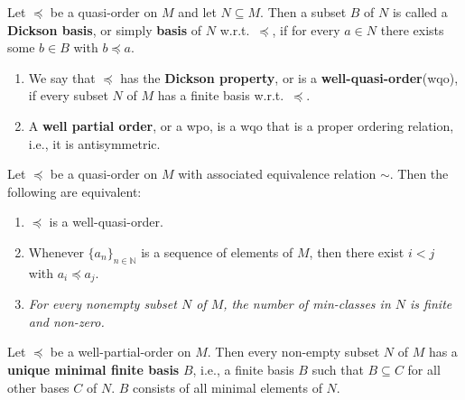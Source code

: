 \begin{definition}\label{def:wqo}
    \leanok %
    Let $\preceq$ be a quasi-order on $M$ and let $N \subseteq M$. 
    Then a subset $B$ of $N$ is called a \textbf{Dickson basis}, or simply \textbf{basis} of $N$ w.r.t.\ $\preceq$, if for every $a \in N$ there exists some $b \in B$ with $b \preceq a$.
    \begin{enumerate}
        \item We say that $\preceq$ has the \textbf{Dickson property}, or is a \textbf{well-quasi-order}(wqo), if every subset $N$ of $M$ has a finite basis w.r.t.\ $\preceq$.
        \item A \textbf{well partial order}, or a wpo, is a wqo that is a proper ordering relation, i.e., it is antisymmetric.
    \end{enumerate}
\end{definition}
    
\begin{proposition}\label{prop:wqoEquivalent} %
    Let $\preceq$ be a quasi-order on $M$ with associated equivalence relation $\sim$. 
    Then the following are equivalent:
    \begin{enumerate}
        \item $\preceq$ is a well-quasi-order.
        \item Whenever $\{a_n\}_{n \in \mathbb{N}}$ is a sequence of elements of $M$, then there exist $i < j$ with $a_i \preceq a_j$.
        \item \textit{For every nonempty subset $N$ of $M$, the number of min-classes in $N$ is finite and non-zero.}
    \end{enumerate}
\end{proposition}
    
\begin{corollary}\label{cor:MinimalFiniteBasis} %
    Let $\preceq$ be a well-partial-order on $M$.
    Then every non-empty subset $N$ of $M$ has a \textup{\textbf{unique minimal finite basis}} $B$, i.e., a finite basis $B$ such that $B \subseteq C$ for all other bases $C$ of $N$. 
    $B$ consists of all minimal elements of $N$.
\end{corollary}
    
